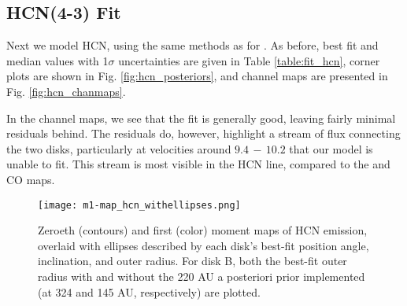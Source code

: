 



\subsection{HCN(4-3) Fit}
\label{subsection:hcn_fit}

Next we model HCN, using the same methods as for \hco. As before, best fit and median values with 1$\sigma$  uncertainties are given in Table \ref{table:fit_hcn}, corner plots are shown in Fig. \ref{fig:hcn_posteriors}, and channel maps are presented in Fig. \ref{fig:hcn_chanmaps}.

In the channel maps, we see that the fit is generally good, leaving fairly minimal residuals behind. The residuals do, however, highlight a stream of flux connecting the two disks, particularly at velocities around $9.4\,-\,10.2$ \kms that our model is unable to fit. This stream is most visible in the HCN line, compared to the \hco and CO maps.

\begin{figure}[htp]
  \hspace*{\fill}%
  \texttt{[image: m1-map\_hcn\_withellipses.png]}\hfill%
  \hspace*{\fill}%
  \caption{Zeroeth (contours) and first (color) moment maps of HCN emission, overlaid with ellipses described by each disk's best-fit position angle, inclination, and outer radius. For disk B, both the best-fit outer radius with and without the 220 AU a posteriori prior implemented (at 324 and 145 AU, respectively) are plotted.}
  \label{fig:hcn_m1_ellipses}
\end{figure}

